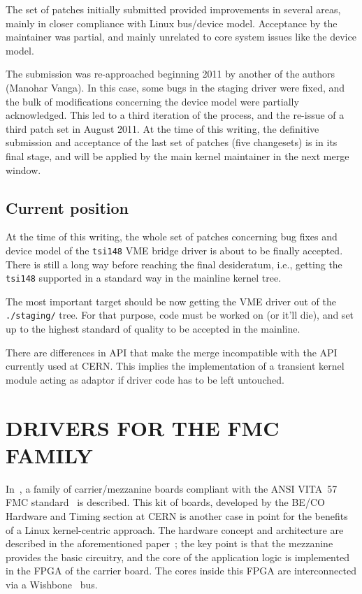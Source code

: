 \documentclass{JAC2003}
\begin{document}
The set of patches initially submitted provided improvements in several
areas, mainly in closer compliance with Linux bus/device model.
Acceptance by the maintainer was partial, and mainly unrelated to core
system issues like the device model.

The submission was re-approached beginning 2011 by another of the
authors (Manohar Vanga). In this case, some bugs in the staging driver
were fixed, and the bulk of modifications concerning the device model
were partially acknowledged. This led to a third iteration of the
process, and the re-issue of a third patch set in August 2011. At the
time of this writing, the definitive submission and acceptance of the
last set of patches (five changesets) is in its final stage, and
will be applied by the main kernel maintainer in the next merge window.

\subsection{Current position}

At the time of this writing, the whole set of patches concerning bug
fixes and device model of the \verb|tsi148| VME bridge driver is
about to be finally accepted. There is still a long way before reaching
the final desideratum, i.e., getting the \verb|tsi148|
supported in a standard way in the mainline kernel tree.
\begin{Itemize}
\item The most important target should be now getting the VME driver out
of the \verb|./staging/| tree. For that purpose, code must be worked on
(or it'll die), and set up to the highest standard of quality to be
accepted in the mainline.
\item There are differences in API that make the merge incompatible with
the API currently used at CERN. This implies the implementation of
a transient 
kernel module acting as adaptor if driver code has to be left untouched.
\end{Itemize}

\section{DRIVERS FOR THE FMC FAMILY}

In~\cite{fpga-fmc}, a family of carrier/mezzanine boards compliant 
with the ANSI VITA~57 FMC standard~\cite{vita-fmc} is described. This kit of boards,
developed by the BE/CO Hardware and Timing section at CERN is
another case in point for the benefits of a Linux kernel-centric
approach. The hardware concept and architecture are described
in the aforementioned paper~\cite{fpga-fmc}; the key point is that the
mezzanine provides the basic circuitry, and the core of the application
logic is implemented in the FPGA of the carrier board. The cores inside
this FPGA are interconnected via a Wishbone~\cite{wishbone-spec} bus.
\end{document}
